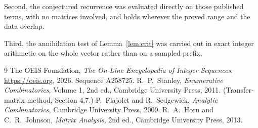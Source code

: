 \documentclass[11pt,a4paper]{article}
\theoremstyle{plain}
\theoremstyle{definition}
\begin{document}
Second, the conjectured recurrence was evaluated directly on those published terms, with no
matrices involved, and holds wherever the proved range and the data overlap.

Third, the annihilation test of Lemma~\ref{lem:crit} was carried out in exact integer
arithmetic on the whole vector rather than on a sampled prefix.

\begin{thebibliography}{9}
 The OEIS Foundation, \emph{The On-Line Encyclopedia of Integer
Sequences}, \url{https://oeis.org}, 2026. Sequence A258725.
 R.~P.~Stanley, \emph{Enumerative Combinatorics}, Volume 1, 2nd ed.,
Cambridge University Press, 2011. (Transfer-matrix method, Section 4.7.)
 P.~Flajolet and R.~Sedgewick, \emph{Analytic Combinatorics}, Cambridge
University Press, 2009.
 R.~A.~Horn and C.~R.~Johnson, \emph{Matrix Analysis}, 2nd ed., Cambridge
University Press, 2013.
\end{thebibliography}
\end{document}
